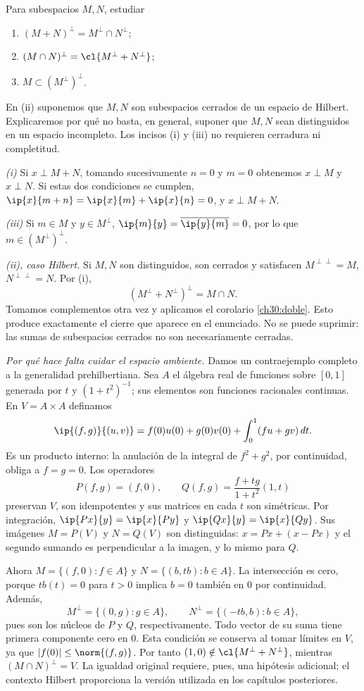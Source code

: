 \begin{ejercicio}
Para subespacios $M,N$, estudiar
\begin{enumerate}[label=(\roman*)]
 \item $(M+N)^{\perp}=M^{\perp}\cap N^{\perp}$;
 \item $(M\cap N)^{\perp}=\cl{M^{\perp}+N^{\perp}}$;
 \item $M\subset(M^{\perp})^{\perp}$.
\end{enumerate}
En (ii) suponemos que $M,N$ son subespacios cerrados de un espacio de Hilbert. Explicaremos por qué no basta, en general, suponer que $M,N$ sean distinguidos en un espacio incompleto. Los incisos (i) y (iii) no requieren cerradura ni completitud.
\end{ejercicio}
\begin{solucion}
\emph{(i)} Si $x\perp M+N$, tomando sucesivamente $n=0$ y $m=0$ obtenemos $x\perp M$ y $x\perp N$. Si estas dos condiciones se cumplen, $\ip{x}{m+n}=\ip{x}{m}+\ip{x}{n}=0$, y $x\perp M+N$.

\emph{(iii)} Si $m\in M$ y $y\in M^{\perp}$, $\ip{m}{y}=\overline{\ip{y}{m}}=0$, por lo que $m\in(M^{\perp})^{\perp}$.

\emph{(ii), caso Hilbert.} Si $M,N$ son distinguidos, son cerrados y satisfacen $M^{\perp\perp}=M$, $N^{\perp\perp}=N$. Por (i),
\[
 (M^{\perp}+N^{\perp})^{\perp}=M\cap N.
\]
Tomamos complementos otra vez y aplicamos el corolario \ref{ch30:doble}. Esto produce exactamente el cierre que aparece en el enunciado. No se puede suprimir: las sumas de subespacios cerrados no son necesariamente cerradas.

\emph{Por qué hace falta cuidar el espacio ambiente.} Damos un contraejemplo completo a la generalidad prehilbertiana. Sea $A$ el álgebra real de funciones sobre $[0,1]$ generada por $t$ y $(1+t^{2})^{-1}$; sus elementos son funciones racionales continuas. En $V=A\times A$ definamos
\[
 \ip{(f,g)}{(u,v)}=f(0)u(0)+g(0)v(0)
 +\int_0^1(fu+gv)\,dt.
\]
Es un producto interno: la anulación de la integral de $f^{2}+g^{2}$, por continuidad, obliga a $f=g=0$. Los operadores
\[
 P(f,g)=(f,0),\qquad
 Q(f,g)=\frac{f+tg}{1+t^{2}}(1,t)
\]
preservan $V$, son idempotentes y sus matrices en cada $t$ son simétricas. Por integración, $\ip{Px}{y}=\ip{x}{Py}$ y $\ip{Qx}{y}=\ip{x}{Qy}$. Sus imágenes $M=P(V)$ y $N=Q(V)$ son distinguidas: $x=Px+(x-Px)$ y el segundo sumando es perpendicular a la imagen, y lo mismo para $Q$.

Ahora $M=\{(f,0):f\in A\}$ y $N=\{(b,tb):b\in A\}$. La intersección es cero, porque $tb(t)=0$ para $t>0$ implica $b=0$ también en $0$ por continuidad. Además,
\[
 M^{\perp}=\{(0,g):g\in A\},\qquad
 N^{\perp}=\{(-tb,b):b\in A\},
\]
pues son los núcleos de $P$ y $Q$, respectivamente. Todo vector de su suma tiene primera componente cero en $0$. Esta condición se conserva al tomar límites en $V$, ya que $|f(0)|\leq\norm{(f,g)}$. Por tanto $(1,0)\notin\cl{M^{\perp}+N^{\perp}}$, mientras $(M\cap N)^{\perp}=V$. La igualdad original requiere, pues, una hipótesis adicional; el contexto Hilbert proporciona la versión utilizada en los capítulos posteriores.
\end{solucion}

